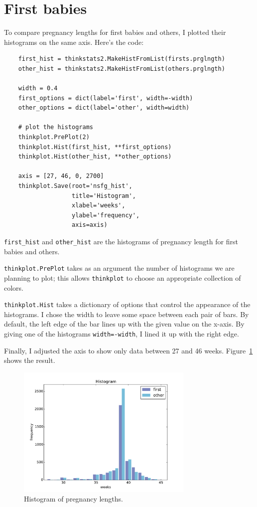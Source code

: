 \documentclass[12pt]{book}
\begin{document}
\section{First babies}

To compare pregnancy lengths for first babies and others, I plotted
their histograms on the same axis.  Here's the code:

\begin{verbatim}
    first_hist = thinkstats2.MakeHistFromList(firsts.prglngth)
    other_hist = thinkstats2.MakeHistFromList(others.prglngth)

    width = 0.4
    first_options = dict(label='first', width=-width)
    other_options = dict(label='other', width=width)

    # plot the histograms
    thinkplot.PrePlot(2)
    thinkplot.Hist(first_hist, **first_options)
    thinkplot.Hist(other_hist, **other_options)

    axis = [27, 46, 0, 2700]
    thinkplot.Save(root='nsfg_hist', 
                   title='Histogram',
                   xlabel='weeks',
                   ylabel='frequency',
                   axis=axis)
\end{verbatim}

\verb"first_hist" and \verb"other_hist" are the histograms of
pregnancy length for first babies and others.

{\tt thinkplot.PrePlot} takes as an argument the number of histograms
we are planning to plot; this allows {\tt thinkplot} to choose
an appropriate collection of colors.

{\tt thinkplot.Hist} takes a dictionary of options that control the
appearance of the histograms.  I chose the width to leave some
space between each pair of bars.  By default, the left edge of the
bar lines up with the given value on the x-axis.  By giving one
of the histograms {\tt width=-width}, I lined it up with the right
edge.

Finally, I adjusted the axis to show only data between 27 and 46 weeks.
Figure~\ref{nsfg_hist} shows the result.

\begin{figure}
\centerline{\includegraphics[height=2.5in]{figs/nsfg_hist.pdf}}
\caption{Histogram of pregnancy lengths.}
\label{nsfg_hist}
\end{figure}
\end{document}
